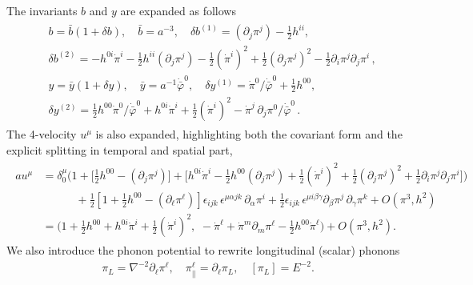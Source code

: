 The invariants $b$ and $y$ are expanded as follows
{\small\begin{align}\label{eq:expansions_b_y}
\begin{aligned}
    &b= \bar{b}(1+\delta b),\quad \bar{b}= a^{-3},\quad
    \delta b^{(1)} = (\partial_j \pi^j)-\tfrac12 h^{ii},\\[3pt]
    &\delta b^{(2)} = - h^{0 i} \dot{\pi}^i - \tfrac12  h^{ii} (\partial_j \pi^j) - \tfrac12 (\dot{\pi}^i)^2 + \tfrac12 (\partial_j \pi^j)^2 -\tfrac12 \partial_i\pi^j\partial_j\pi^i\,,
    \\[3pt]
    &y= \bar{y}(1+\delta y),\quad \bar{y}= a^{-1}\dot{\bar{\varphi}}^0,\quad \delta y^{(1)} =\dot{\pi}^0/\dot{\bar{\varphi}}^0  +\tfrac12 h^{00},\\[3pt]
    &\delta y^{(2)} = \tfrac12 h^{00}\dot{\pi}^0/\dot{\bar{\varphi}}^0+ h^{0 i} \dot{\pi}^i  + \tfrac12 (\dot{\pi}^i)^2 -\dot{\pi}^j\,\partial_j\pi^0/\dot{\bar{\varphi}}^0\,.
\end{aligned}\end{align}}
The 4-velocity $u^\mu$ is also expanded, highlighting both the covariant form and the explicit splitting in temporal and spatial part,
{\small\begin{align}\label{eq:expansion_u_4_velocity}
\begin{aligned}
    au^\mu&=\delta_0^\mu \bigg(1 \!+\! \Big[\tfrac12 h^{00} -(\partial_j \pi^j)\Big]\! +\! \Big[ h^{0 i} \dot{\pi}^i -\tfrac12 h^{00} (\partial_j \pi^j) + \tfrac12 (\dot{\pi}^i)^2 + \tfrac12 (\partial_j \pi^j)^2 +\tfrac12 \partial_i\pi^j\partial_j\pi^i\Big]\bigg)
    \\
    &\quad\qquad+\tfrac{1}{2}\left[1 + \tfrac12 h^{00}-(\partial_\ell\pi^\ell)\right]
     \epsilon_{i j k}\,\epsilon^{\mu \alpha j k}\,\partial_\alpha\pi^i 
     +\frac{1}{2} \epsilon_{ijk}\, \epsilon^{\mu i \beta\gamma}\partial_\beta\pi^j\,\partial_\gamma\pi^k
    + O(\pi^3, h^2)\\[3pt]
    &=\Big(1 + \tfrac12 h^{00} +h^{0i}\dot{\pi}^i+ \tfrac12 (\dot{\pi}^i)^2,\,\,- \dot{\pi}^\ell + \dot{\pi}^m \partial_m\pi^\ell - \tfrac12 h^{00}\dot{\pi}^\ell\Big)+ O(\pi^3, h^2).
\end{aligned}\end{align}}
%
We also introduce the phonon potential to rewrite longitudinal (scalar) phonons
\begin{align}\label{eq:phonon_potential}
    \pi_L=\nabla^{-2}\partial_\ell\pi^\ell, \quad \pi^\ell_{\text{||}}=\partial_\ell \pi_L,\quad  [\pi_L]=E^{-2}.
\end{align}
